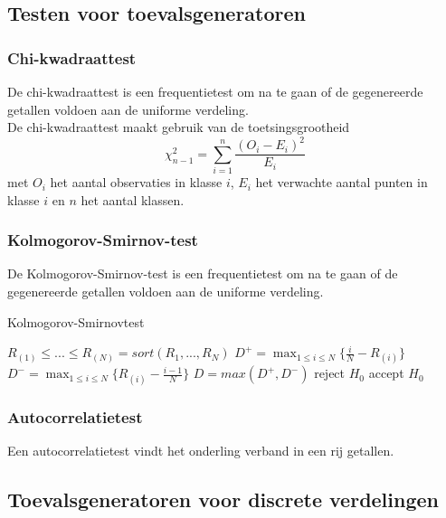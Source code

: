 \documentclass{article}
\begin{document}
	\subsection{Testen voor toevalsgeneratoren}
	
	\subsubsection{Chi-kwadraattest}
	
	De chi-kwadraattest is een frequentietest om na te gaan of de gegenereerde getallen voldoen aan de uniforme verdeling.\\
	
	De chi-kwadraattest maakt gebruik van de toetsingsgrootheid
	$$
		\chi_{n-1}^2 = \sum_{i=1}^{n} \frac{(O_i - E_i)^2}{E_i}
	$$
	met $O_i$ het aantal observaties in klasse $i$, $E_i$ het verwachte aantal punten in klasse $i$ en $n$ het aantal klassen.
	
	
	\subsubsection{Kolmogorov-Smirnov-test}
	
	De Kolmogorov-Smirnov-test is een frequentietest om na te gaan of de gegenereerde getallen voldoen aan de uniforme verdeling.\\
	
	\begin{algorithm}[!ht]
		\caption{Kolmogorov-Smirnovtest}
		\begin{algorithmic}[1]
				\State $R_{(1)} \leq ... \leq R_{(N)} = sort(R_1, ..., R_N)$
				\State $D^+ = \max_{1 \leq i \leq N}\{\frac{i}{N} - R_{(i)}\}$
				\State $D^- = \max_{1 \leq i \leq N}\{R_{(i)} - \frac{i-1}{N}\}$
				\State $D = max(D^+, D^-)$
					\State reject $H_0$
				\Else
					\State accept $H_0$
				\EndIf				
			\EndProcedure
		\end{algorithmic}
	\end{algorithm}
	
	
	\subsubsection{Autocorrelatietest}
	
	Een autocorrelatietest vindt het onderling verband in een rij getallen.
	
	
	\subsection{Toevalsgeneratoren voor discrete verdelingen}
	
\end{document}
